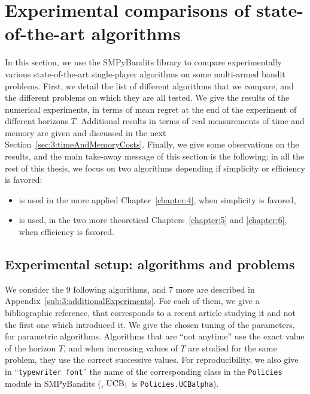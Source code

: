 \section{Experimental comparisons of state-of-the-art algorithms}
\label{sec:3:reviewSPAlgorithms}


In this section, we use the SMPyBandits library to compare experimentally various state-of-the-art single-player algorithms on some multi-armed bandit problems.
First, we detail the list of different algorithms that we compare, and the different problems on which they are all tested.
We give the results of the numerical experiments, in terms of mean regret at the end of the experiment of different horizons $T$.
Additional results in terms of real measurements of time and memory are given and discussed in the next Section~\ref{sec:3:timeAndMemoryCosts}.
%
Finally, we give some observations on the results, and the main take-away message of this section is the following: in all the rest of this thesis, we focus on two algorithms depending if simplicity or efficiency is favored:
\begin{itemize}
    \item
    \UCB{} is used in the more applied Chapter~\ref{chapter:4}, when simplicity is favored,
    \item
    \klUCB{} is used, in the two more theoretical Chapters~\ref{chapter:5} and \ref{chapter:6}, when efficiency is favored.
\end{itemize}


\subsection{Experimental setup: algorithms and problems}


We consider the $9$ following algorithms, and $7$ more are described in Appendix~\ref{sub:3:additionalExperiments}.
For each of them, we give a bibliographic reference, that corresponds to a recent article studying it and not the first one which introduced it.
We give the chosen tuning of the parameters, for parametric algorithms.
Algorithms that are ``not anytime'' use the exact value of the horizon $T$, and when increasing values of $T$ are studied for the same problem, they use the correct successive values.
%
For reproducibility, we also give in ``\texttt{typewriter font}'' the name of the corresponding class in the \texttt{Policies} module in SMPyBandits
(\eg, $\mathrm{UCB}_1$ is \texttt{Policies.UCBalpha}).

